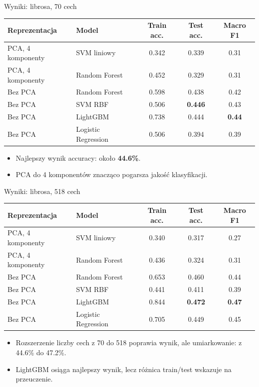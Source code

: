 \documentclass[aspectratio=1610,polish]{beamer}
\newcommand{\acc}[1]{\textbf{#1}}
\newcommand{\smalltable}{\scriptsize}
\begin{document}
\begin{frame}{Wyniki: librosa, 70 cech}
	\smalltable
	\begin{tabular}{p{}p{}ccc}
		\toprule
		Reprezentacja & Model & Train acc. & Test acc. & Macro F1 \\
		\midrule
		PCA, 4 komponenty & SVM liniowy & 0.342 & 0.339 & 0.31 \\
		PCA, 4 komponenty & Random Forest & 0.452 & 0.329 & 0.31 \\
		Bez PCA & Random Forest & 0.598 & 0.438 & 0.42 \\
		Bez PCA & SVM RBF & 0.506 & \acc{0.446} & 0.43 \\
		Bez PCA & LightGBM & 0.738 & 0.444 & \acc{0.44} \\
		Bez PCA & Logistic Regression & 0.506 & 0.394 & 0.39 \\
		\bottomrule
	\end{tabular}

	\vspace{0.6em}
	\begin{itemize}
		\item Najlepszy wynik accuracy: około \textbf{44.6\%}.
		\item PCA do 4 komponentów znacząco pogarsza jakość klasyfikacji.
	\end{itemize}
\end{frame}

\begin{frame}{Wyniki: librosa, 518 cech}
	\smalltable
	\begin{tabular}{p{}p{}ccc}
		\toprule
		Reprezentacja & Model & Train acc. & Test acc. & Macro F1 \\
		\midrule
		PCA, 4 komponenty & SVM liniowy & 0.340 & 0.317 & 0.27 \\
		PCA, 4 komponenty & Random Forest & 0.436 & 0.324 & 0.31 \\
		Bez PCA & Random Forest & 0.653 & 0.460 & 0.44 \\
		Bez PCA & SVM RBF & 0.441 & 0.411 & 0.39 \\
		Bez PCA & LightGBM & 0.844 & \acc{0.472} & \acc{0.47} \\
		Bez PCA & Logistic Regression & 0.705 & 0.449 & 0.45 \\
		\bottomrule
	\end{tabular}

	\vspace{0.6em}
	\begin{itemize}
		\item Rozszerzenie liczby cech z 70 do 518 poprawia wynik, ale umiarkowanie: z 44.6\% do 47.2\%.
		\item LightGBM osiąga najlepszy wynik, lecz różnica train/test wskazuje na przeuczenie.
	\end{itemize}
\end{frame}
\end{document}

